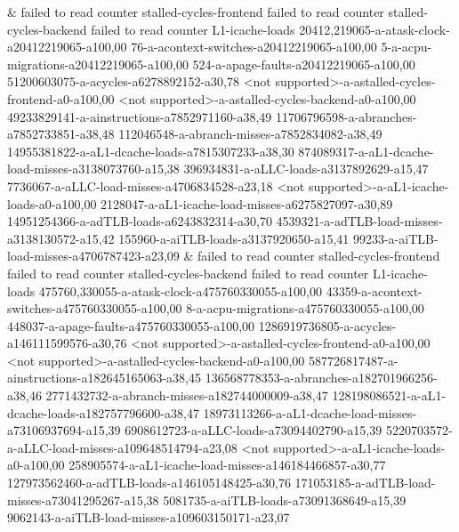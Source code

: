 &
failed to read counter stalled-cycles-frontend failed to read counter stalled-cycles-backend failed to read counter L1-icache-loads 20412,219065-a-atask-clock-a20412219065-a100,00 76-a-acontext-switches-a20412219065-a100,00 5-a-acpu-migrations-a20412219065-a100,00 524-a-apage-faults-a20412219065-a100,00 51200603075-a-acycles-a6278892152-a30,78 <not supported>-a-astalled-cycles-frontend-a0-a100,00 <not supported>-a-astalled-cycles-backend-a0-a100,00 49233829141-a-ainstructions-a7852971160-a38,49 11706796598-a-abranches-a7852733851-a38,48 112046548-a-abranch-misses-a7852834082-a38,49 14955381822-a-aL1-dcache-loads-a7815307233-a38,30 874089317-a-aL1-dcache-load-misses-a3138073760-a15,38 396934831-a-aLLC-loads-a3137892629-a15,47 7736067-a-aLLC-load-misses-a4706834528-a23,18 <not supported>-a-aL1-icache-loads-a0-a100,00 2128047-a-aL1-icache-load-misses-a6275827097-a30,89 14951254366-a-adTLB-loads-a6243832314-a30,70 4539321-a-adTLB-load-misses-a3138130572-a15,42 155960-a-aiTLB-loads-a3137920650-a15,41 99233-a-aiTLB-load-misses-a4706787423-a23,09
&
failed to read counter stalled-cycles-frontend failed to read counter stalled-cycles-backend failed to read counter L1-icache-loads 475760,330055-a-atask-clock-a475760330055-a100,00 43359-a-acontext-switches-a475760330055-a100,00 8-a-acpu-migrations-a475760330055-a100,00 448037-a-apage-faults-a475760330055-a100,00 1286919736805-a-acycles-a146111599576-a30,76 <not supported>-a-astalled-cycles-frontend-a0-a100,00 <not supported>-a-astalled-cycles-backend-a0-a100,00 587726817487-a-ainstructions-a182645165063-a38,45 136568778353-a-abranches-a182701966256-a38,46 2771432732-a-abranch-misses-a182744000009-a38,47 128198086521-a-aL1-dcache-loads-a182757796600-a38,47 18973113266-a-aL1-dcache-load-misses-a73106937694-a15,39 6908612723-a-aLLC-loads-a73094402790-a15,39 5220703572-a-aLLC-load-misses-a109648514794-a23,08 <not supported>-a-aL1-icache-loads-a0-a100,00 258905574-a-aL1-icache-load-misses-a146184466857-a30,77 127973562460-a-adTLB-loads-a146105148425-a30,76 171053185-a-adTLB-load-misses-a73041295267-a15,38 5081735-a-aiTLB-loads-a73091368649-a15,39 9062143-a-aiTLB-load-misses-a109603150171-a23,07
